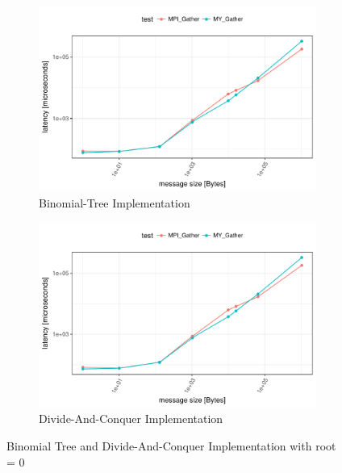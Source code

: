 \begin{figure}[H]
  \centering
  \begin{subfigure}[b]{0.49\textwidth}
        \includegraphics[width=\textwidth]{../benchmarks/openmpi/binom/gather_32/runtime.pdf}
        \caption{Binomial-Tree Implementation}
    \end{subfigure}
    \begin{subfigure}[b]{0.49\textwidth}
        \includegraphics[width=\textwidth]{../benchmarks/openmpi/divide_conquer/gather32/runtime.pdf}
        \caption{Divide-And-Conquer Implementation}
    \end{subfigure}
    \caption{Binomial Tree and Divide-And-Conquer Implementation with root = 0}
    \label{fig:gather:binom_vs_dac}
\end{figure}

